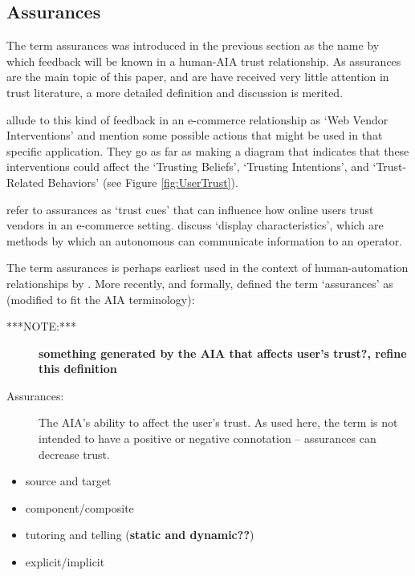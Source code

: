 \subsection{Assurances}
    The term assurances was introduced in the previous section as the name by which feedback will be known in a human-AIA trust relationship. As assurances are the main topic of this paper, and are have received very little attention in trust literature, a more detailed definition and discussion is merited.

    \citet{McKnight2001-fa} allude to this kind of feedback in an e-commerce relationship as `Web Vendor Interventions' and mention some possible actions that might be used in that specific application. They go as far as making a diagram that indicates that these interventions could affect the `Trusting Beliefs', `Trusting Intentions', and `Trust-Related Behaviors' (see Figure \ref{fig:UserTrust}).

    \citet{Corritore2003-gx} refer to assurances as `trust cues' that can influence how online users trust vendors in an e-commerce setting. \citet{Lee2004-pv} discuss `display characteristics', which are methods by which an autonomous can communicate information to an operator.
    
    The term assurances is perhaps earliest used in the context of human-automation relationships by \citet{Sheridan1984-kx}. More recently, and formally, \citet{Lillard2016-yg} defined the term `assurances' as (modified to fit the AIA terminology):
    
    \begin{description}
    \item [***NOTE:***] \textbf{something generated by the AIA that affects user's trust?, refine this definition}
        \item [Assurances:] The AIA's ability to affect the user's trust. As used here, the term is not intended to have a positive or negative connotation -- assurances can decrease trust.
    \end{description}

    \begin{itemize}
        \item source and target
        \item component/composite
        \item tutoring and telling (\textbf{static and dynamic??})
        \item explicit/implicit
    \end{itemize}

